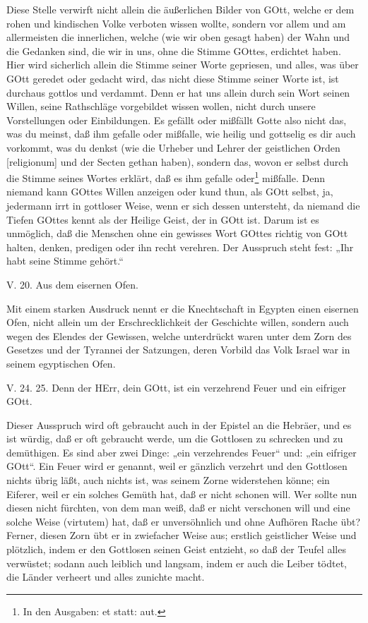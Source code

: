 Diese Stelle verwirft nicht allein die äußerlichen Bilder von GOtt, welche er dem rohen und kindischen Volke verboten wissen wollte, sondern vor allem und am allermeisten die innerlichen, welche (wie wir oben gesagt haben) der Wahn und die Gedanken sind, die wir in uns, ohne die Stimme GOttes, erdichtet haben. Hier wird sicherlich allein die Stimme seiner Worte gepriesen, und alles, was über GOtt geredet oder gedacht wird, das nicht diese Stimme seiner Worte ist, ist durchaus gottlos und verdammt. Denn er hat uns allein durch sein Wort seinen Willen, seine Rathschläge vorgebildet wissen wollen, nicht durch unsere Vorstellungen oder Einbildungen. Es gefällt oder mißfällt Gotte also nicht das, was du meinst, daß ihm gefalle oder mißfalle, wie heilig und gottselig es dir auch vorkommt, was du denkst (wie die Urheber und Lehrer der geistlichen Orden [religionum] und der Secten gethan haben), sondern das, wovon er selbst durch die Stimme seines Wortes erklärt, daß es ihm gefalle oder\footnote{In den Ausgaben: et statt: aut.} mißfalle. Denn niemand kann GOttes Willen anzeigen oder kund thun, als GOtt selbst, ja, jedermann irrt in gottloser Weise, wenn er sich dessen untersteht, da niemand die Tiefen GOttes kennt als der Heilige Geist, der in GOtt ist. Darum ist es unmöglich, daß die Menschen ohne ein gewisses Wort GOttes richtig von GOtt halten, denken, predigen oder ihn recht verehren. Der Ausspruch steht fest: „Ihr habt seine Stimme gehört.“

\begin{schriftzitat}
V. 20. Aus dem eisernen Ofen.
\end{schriftzitat}

Mit einem starken Ausdruck nennt er die Knechtschaft in Egypten einen eisernen Ofen, nicht allein um der Erschrecklichkeit der Geschichte willen, sondern auch wegen des Elendes der Gewissen, welche unterdrückt waren unter dem Zorn des Gesetzes und der Tyrannei der Satzungen, deren Vorbild das Volk Israel war in seinem egyptischen Ofen.

\begin{schriftzitat}
V. 24. 25. Denn der HErr, dein GOtt, ist ein verzehrend Feuer und ein eifriger GOtt.
\end{schriftzitat}

Dieser Ausspruch wird oft gebraucht auch in der Epistel an die Hebräer, und es ist würdig, daß er oft gebraucht werde, um die Gottlosen zu schrecken und zu demüthigen. Es sind aber zwei Dinge: „ein verzehrendes Feuer“ und: „ein
eifriger GOtt“. Ein Feuer wird er genannt, weil er gänzlich verzehrt und den Gottlosen nichts übrig läßt, auch nichts ist, was seinem Zorne widerstehen könne; ein Eiferer, weil er ein solches Gemüth hat, daß er nicht schonen will. Wer sollte nun diesen nicht fürchten, von dem man weiß, daß er nicht verschonen will und eine solche Weise (virtutem) hat, daß er unversöhnlich und ohne Aufhören Rache übt? Ferner, diesen Zorn übt er in zwiefacher Weise aus; erstlich geistlicher Weise und plötzlich, indem er den Gottlosen seinen Geist entzieht, so daß der Teufel alles verwüstet; sodann auch leiblich und langsam, indem er auch die Leiber tödtet, die Länder verheert und alles zunichte macht.


